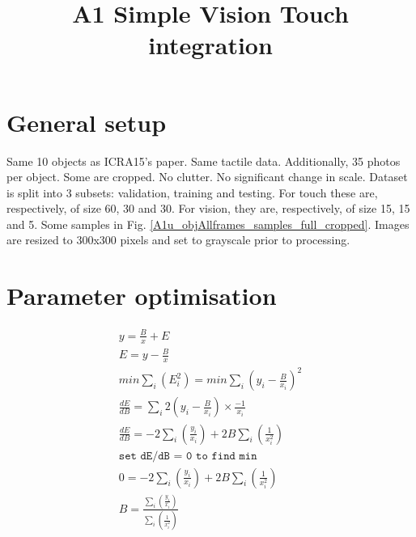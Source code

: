 \documentclass[]{article}
\title{A1 Simple Vision Touch integration}
\author{}
\begin{document}
\maketitle

\begin{abstract}

\end{abstract}

\section{General setup}
Same 10 objects as ICRA15's paper. Same tactile data. Additionally, 35 photos per object. Some are cropped. No clutter. No significant change in scale.
Dataset is split into 3 subsets: validation, training and testing. For touch these are, respectively, of size 60, 30 and 30. For vision, they are, respectively, of size 15, 15 and 5.
Some samples in Fig. \ref{A1u_objAllframes_samples_full_cropped}. Images are resized to 300x300 pixels and set to grayscale prior to processing.

\begin{figure}
\centering
{}
\end{figure}



\section{Parameter optimisation}

\begin{eqnarray}
y = \frac{B}{x} + E \\
E = y - \frac{B}{x} \\
min\sum_{i}(E_i^2) = min \sum_{i}(y_i - \frac{B}{x_i})^2 \\
\frac{dE}{dB} = \sum_{i}2(y_i-\frac{B}{x_i}) \times \frac{-1}{x_i} \\
\frac{dE}{dB} = -2\sum_{i}(\frac{y_i}{x_i}) + 2B\sum_{i}(\frac{1}{x_i^2}) \\ 
\texttt{set dE/dB = 0 to find min} \\
0 = -2\sum_{i}(\frac{y_i}{x_i}) + 2B\sum_{i}(\frac{1}{x_i^2}) \\
B = \frac{\sum_{i}(\frac{y_i}{x_i})}{\sum_{i}(\frac{1}{x_i^2})}
\end{eqnarray}
\end{document}
